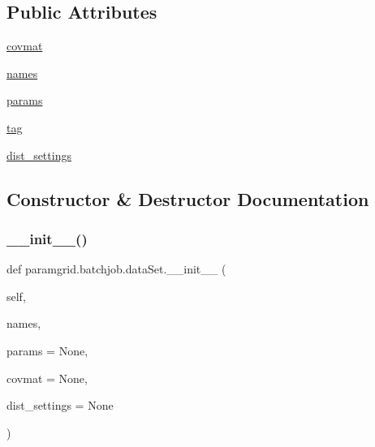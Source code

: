 \subsection*{Public Attributes}
\begin{DoxyCompactItemize}
\item 
\mbox{\hyperlink{classparamgrid_1_1batchjob_1_1dataSet_ae6ece3eca345f34b788891db79d3e342}{covmat}}
\item 
\mbox{\hyperlink{classparamgrid_1_1batchjob_1_1dataSet_a86a86b957e4f12dab12516869aee8733}{names}}
\item 
\mbox{\hyperlink{classparamgrid_1_1batchjob_1_1dataSet_a6d77aeb259e7f9af2fee71288a0c8087}{params}}
\item 
\mbox{\hyperlink{classparamgrid_1_1batchjob_1_1dataSet_acc70d1eb881555de9dba4159593e2d26}{tag}}
\item 
\mbox{\hyperlink{classparamgrid_1_1batchjob_1_1dataSet_aba36a3329ba1cc35cad06dd4e862c6bc}{dist\+\_\+settings}}
\end{DoxyCompactItemize}


\subsection{Constructor \& Destructor Documentation}
\mbox{\label{classparamgrid_1_1batchjob_1_1dataSet_a70de259072c5e4c65eb476449bbebf9f}} 
\subsubsection{\texorpdfstring{\+\_\+\+\_\+init\+\_\+\+\_\+()}{\_\_init\_\_()}}
{\footnotesize\ttfamily def paramgrid.\+batchjob.\+data\+Set.\+\_\+\+\_\+init\+\_\+\+\_\+ (\begin{DoxyParamCaption}\item[{}]{self,  }\item[{}]{names,  }\item[{}]{params = {\ttfamily None},  }\item[{}]{covmat = {\ttfamily None},  }\item[{}]{dist\+\_\+settings = {\ttfamily None} }\end{DoxyParamCaption})}



